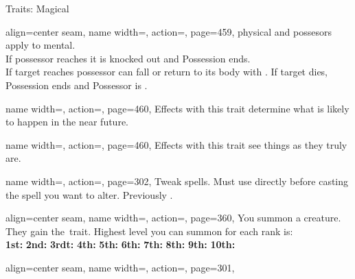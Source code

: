 \begin{PageFront}
\begin{Tables}{\frontTableHeight}
\begin{Table}{Traits: Magical}
\begin{entry}{}{%
                align=center seam,
                name width=\conditionLength,%
                action=\Possession,
                page=459,
            }
{                physical and possesors apply to mental.}\\
                If possessor reaches  \HPs it is knocked out and Possession ends.\\
                If target reaches  \HPs possessor can fall \Unconscious or return to its body with .
                \hfill If target dies, Possession ends and Possessor is \Stunned {}.
            \end{entry}
            \begin{entry}{}{%
                name width=\conditionLength,%
                action=\Prediction,
                page=460,
            }
                Effects with this trait determine what is likely to happen in the near future.
            \end{entry}
            \begin{entry}{}{%
                name width=\conditionLength,%
                action=\Revelation,
                page=460,
            }
                Effects with this trait see things as they truly are.
            \end{entry}
            \begin{entry}{}{%
                name width=\conditionLength,%
                action=\Spellshape,
                page=302,
            }
                Tweak spells. Must use directly before casting the spell you want to alter. \hfill Previously
                \Metamagic.
            \end{entry}
            \begin{entry}{}{%
                align=center seam,
                name width=\conditionLength,%
                action=\Summon,
                page=360,
            }
                You summon a creature. They gain the \Summoned\,trait. Highest level you can summon for each rank
                is:\\
                \textbf{1st:} 
                \hfill\textbf{2nd:} 
                \hfill\textbf{3rdt:} 
                \hfill\textbf{4th:} 
                \hfill\textbf{5th:} 
                \hfill\textbf{6th:} 
                \hfill\textbf{7th:} 
                \hfill\textbf{8th:} 
                \hfill\textbf{9th:} 
                \hfill\textbf{10th:} 
            \end{entry}
            \begin{entry}{}{%
                align=center seam,
                name width=\conditionLength,%
                action=\Summoned,
                page=301,
            }

\end{entry}
\end{Table}
\end{Tables}
\end{PageFront}
